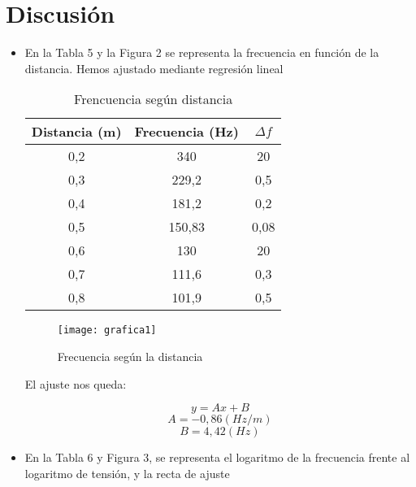 \documentclass[a4paper,12pt,spanish]{article}
\begin{document}
\section{Discusión}

\begin{itemize}
	\item{En la Tabla 5 y la Figura 2 se representa la frecuencia en función de la distancia. Hemos ajustado mediante regresión lineal}
	
	
	\begin{table}[H]
		\centering
		\begin{tabular}{|c|c|c|}
			\hline
			\textbf{Distancia (m)} & \textbf{Frecuencia (Hz)} & \textbf{$\Delta f$} \\ \hline
			0,2                 & 340                 & 20        \\ \hline
			0,3                 & 229,2               & 0,5        \\ \hline
			0,4                 & 181,2               & 0,2        \\ \hline
			0,5                 & 150,83               & 0,08        \\ \hline
			0,6                 & 130               & 20       \\ \hline
			0,7                 & 111,6               & 0,3       \\ \hline
			0,8                 & 101,9               & 0,5        \\ \hline
		\end{tabular}
		\caption{Frencuencia según distancia}
	\end{table}
	
	
	\begin{figure}[H]
		\centering
		\texttt{[image: grafica1]}
		\caption{Frecuencia según la distancia}
		\label{fig:grafica1}
	\end{figure}
	
	
	El ajuste nos queda:
	
	\[ y = Ax+B\]
	\[A = -0,86   (\si{Hz/m}) \]
	\[B = 4,42  (\si{Hz})  \]
	
	
	\item{En la Tabla 6 y Figura 3, se representa el logaritmo de la frecuencia frente al logaritmo de tensión, y la recta de ajuste}
	
	
	

\end{itemize}
\end{document}
